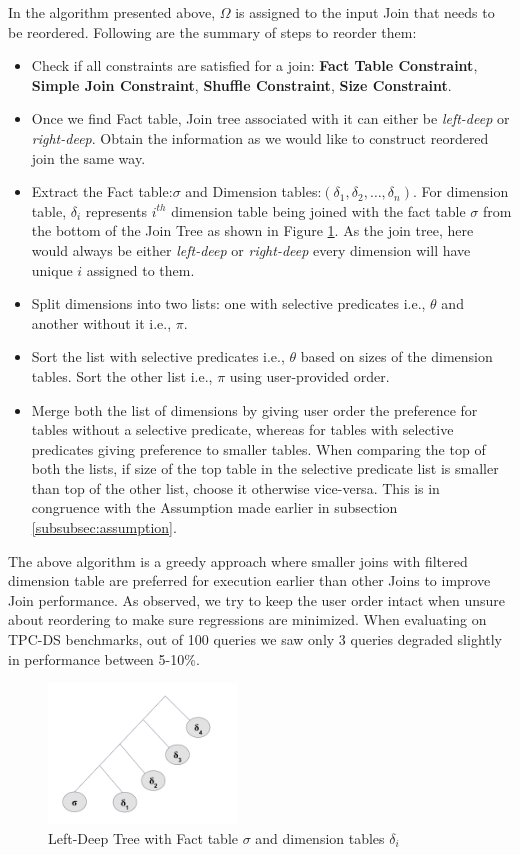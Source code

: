In the algorithm presented above, $\Omega$ is assigned to the input Join that needs to be reordered. Following are the summary of steps to reorder them:
\begin{itemize}
\item Check if all constraints are satisfied for a join: \textbf{Fact Table Constraint}, \textbf{Simple Join Constraint}, \textbf{Shuffle Constraint}, \textbf{Size Constraint}.
\item Once we find Fact table, Join tree associated with it can either be \textit{left-deep} or \textit{right-deep}. Obtain the information as we would like to construct reordered join the same way.
\item Extract the Fact table:$\sigma$ and Dimension tables:$ (\delta_1, \delta_2, \ldots, \delta_n)$. For dimension table, $\delta_i$ represents  $i^{th}$ dimension table being joined with the fact table $\sigma$ from the bottom of the Join Tree as shown in Figure \ref{left-deep}. As the join tree, here would always be either \textit{left-deep} or \textit{right-deep} every dimension will have unique $i$ assigned to them.
\item Split dimensions into two lists: one with selective predicates i.e., $\theta$ and another without it i.e., $\pi$.
\item Sort the list with selective predicates i.e., $\theta$ based on sizes of the dimension tables. Sort the other list i.e., $\pi$ using user-provided order.
\item Merge both the list of dimensions by giving user order the preference for tables without a selective predicate, whereas for tables with selective predicates giving preference to smaller tables. When comparing the top of both the lists, if size of the top table in the selective predicate list is smaller than top of the other list, choose it otherwise vice-versa. This is in congruence with the Assumption made earlier in subsection \ref{subsubsec:assumption}.
\end{itemize}

The above algorithm is a greedy approach where smaller joins with filtered dimension table are preferred for execution earlier than other Joins to improve Join performance. As observed, we try to keep the user order intact when unsure about reordering to make sure regressions are minimized. When evaluating on TPC-DS benchmarks, out of 100 queries we saw only 3 queries degraded slightly in performance between  5-10\%.

\begin{figure}[ht]
\centerline{\includegraphics[width=5cm]{fig/left-deep.png}}
\caption{Left-Deep Tree with Fact table $\sigma$ and dimension tables $\delta_i$}
\label{left-deep}
\end{figure}

